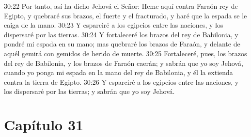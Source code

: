 30:22 Por tanto, así ha dicho Jehová el Señor: Heme aquí contra Faraón rey de Egipto, y quebraré sus brazos, el fuerte y el fracturado, y haré que la espada se le caiga de la mano.   
30:23 Y esparciré a los egipcios entre las naciones, y los dispersaré por las tierras.   
30:24 Y fortaleceré los brazos del rey de Babilonia, y pondré mi espada en su mano; mas quebraré los brazos de Faraón, y delante de aquél gemirá con gemidos de herido de muerte.   
30:25 Fortaleceré, pues, los brazos del rey de Babilonia, y los brazos de Faraón caerán; y sabrán que yo soy Jehová, cuando yo ponga mi espada en la mano del rey de Babilonia, y él la extienda contra la tierra de Egipto.   
30:26 Y esparciré a los egipcios entre las naciones, y los dispersaré por las tierras; y sabrán que yo soy Jehová.   
\section*{Capítulo 31 } 
  
